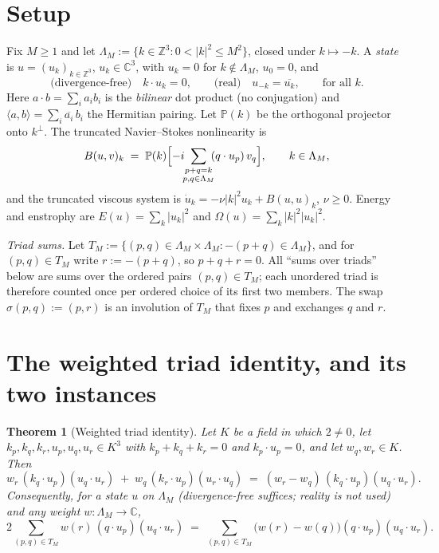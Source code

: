 \documentclass[11pt]{amsart}
\newcommand{\C}{\mathbb{C}}
\newcommand{\Z}{\mathbb{Z}}
\newcommand{\Lam}{\Lambda_M}
\theoremstyle{plain}
\newtheorem{theorem}{Theorem}[section]
\theoremstyle{definition}
\theoremstyle{remark}
\begin{document}
\section{Setup}
\label{sec:setup}

Fix $M \ge 1$ and let $\Lam := \{k \in \Z^3 : 0 < |k|^2 \le M^2\}$, closed under $k \mapsto -k$.
A \emph{state} is $u = (u_k)_{k \in \Z^3}$, $u_k \in \C^3$, with $u_k = 0$ for $k \notin \Lam$,
$u_0 = 0$, and
\[
  \text{(divergence-free)}\quad k \cdot u_k = 0, \qquad
  \text{(real)}\quad u_{-k} = \overline{u_k}, \qquad \text{for all } k.
\]
Here $a \cdot b = \sum_i a_i b_i$ is the \emph{bilinear} dot product (no conjugation) and
$\langle a, b\rangle = \sum_i \overline{a_i}\, b_i$ the Hermitian pairing. Let $\mathbb{P}(k)$ be
the orthogonal projector onto $k^\perp$. The truncated Navier--Stokes nonlinearity is
\begin{equation}
  \label{eq:Bop}
  B(u,v)_k \;=\; \mathbb{P}(k)\Bigl[-i\!\!\sum_{\substack{p+q=k\\ p,q \in \Lam}}\!\!(q\cdot u_p)\,v_q\Bigr],
  \qquad k \in \Lam,
\end{equation}
and the truncated viscous system is $\dot u_k = -\nu|k|^2 u_k + B(u,u)_k$, $\nu \ge 0$. Energy
and enstrophy are $E(u) = \sum_k |u_k|^2$ and $\Omega(u) = \sum_k |k|^2|u_k|^2$.

\emph{Triad sums.} Let $T_M := \{(p,q) \in \Lam \times \Lam : -(p+q) \in \Lam\}$, and for
$(p,q) \in T_M$ write $r := -(p+q)$, so $p + q + r = 0$. All ``sums over triads'' below are sums
over the ordered pairs $(p,q) \in T_M$; each unordered triad is therefore counted once per ordered
choice of its first two members. The swap $\sigma(p,q) := (p, r)$ is an involution of $T_M$ that
fixes $p$ and exchanges $q$ and $r$.

\section{The weighted triad identity, and its two instances}
\label{sec:weighted}

\begin{theorem}[Weighted triad identity]
\label{thm:weighted}
Let $K$ be a field in which $2 \ne 0$, let $k_p, k_q, k_r, u_p, u_q, u_r \in K^3$ with
$k_p + k_q + k_r = 0$ and $k_p \cdot u_p = 0$, and let $w_q, w_r \in K$. Then
\begin{equation}
  \label{eq:weighted}
  w_r\,(k_q \cdot u_p)(u_q \cdot u_r) \;+\; w_q\,(k_r \cdot u_p)(u_r \cdot u_q)
  \;=\; (w_r - w_q)\,(k_q \cdot u_p)(u_q \cdot u_r).
\end{equation}
Consequently, for a state $u$ on $\Lam$ (divergence-free suffices; reality is not used) and any
weight $w : \Lam \to \C$,
\begin{equation}
  \label{eq:wsum}
  2\sum_{(p,q) \in T_M} w(r)\,(q \cdot u_p)(u_q \cdot u_r)
  \;=\; \sum_{(p,q) \in T_M} \bigl(w(r) - w(q)\bigr)(q \cdot u_p)(u_q \cdot u_r).
\end{equation}
\end{theorem}
\end{document}
